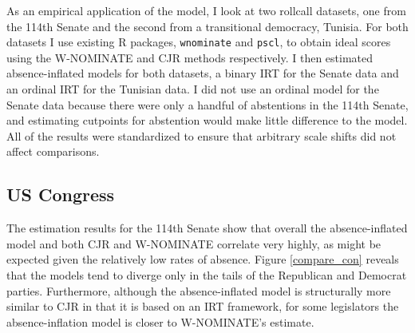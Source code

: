 	As an empirical application of the model, I look at two rollcall datasets, one from the 114th Senate and the second from a transitional democracy, Tunisia. For both datasets I use existing R packages, \texttt{wnominate} and \texttt{pscl}, to obtain ideal scores using the W-NOMINATE and CJR methods respectively. I then estimated absence-inflated models for both datasets, a binary IRT for the Senate data and an ordinal IRT for the Tunisian data. I did not use an ordinal model for the Senate data because there were only a handful of abstentions in the 114th Senate, and estimating cutpoints for abstention would make little difference to the model. All of the results were standardized to ensure that arbitrary scale shifts did not affect comparisons.
	
	\subsection{US Congress}
	
	The estimation results for the 114th Senate show that overall the absence-inflated model and both CJR and W-NOMINATE correlate very highly, as might be expected given the relatively low rates of absence. Figure \ref{compare_con} reveals that the models tend to diverge only in the tails of the Republican and Democrat parties. Furthermore, although the absence-inflated model is structurally more similar to CJR in that it is based on an IRT framework, for some legislators the absence-inflation model is closer to W-NOMINATE's estimate. 
	
